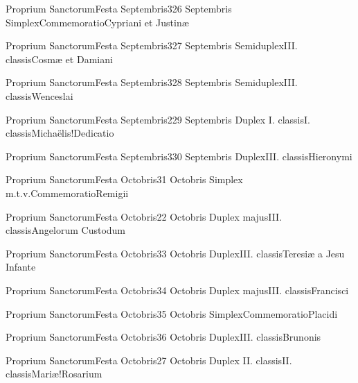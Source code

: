 \documentclass[psalterium-feriale.tex]{subfiles}
\begin{document}
	{Proprium Sanctorum}{Festa Septembris}{3}{26 Septembris}
	{Simplex}{Commemoratio}{Cypriani et Justinæ}
	{}
	{}
\PMEXaRubric

	{Proprium Sanctorum}{Festa Septembris}{3}{27 Septembris}
	{Semiduplex}{III. classis}{Cosmæ et Damiani}
	{}
	{}
\PMEXaRubric

	{Proprium Sanctorum}{Festa Septembris}{3}{28 Septembris}
	{Semiduplex}{III. classis}{Wenceslai}
	{}
	{}
\UMEXaRubric

	{Proprium Sanctorum}{Festa Septembris}{2}{29 Septembris}
	{Duplex I. classis}{I. classis}{Michaëlis!Dedicatio}
	{}
	{}
\psalmodiapropria

	{Proprium Sanctorum}{Festa Septembris}{3}{30 Septembris}
	{Duplex}{III. classis}{Hieronymi}
	{}
	{}
\COPOcRubric

	{Proprium Sanctorum}{Festa Octobris}{3}{1 Octobris}
	{Simplex m.t.v.}{Commemoratio}{Remigii}
	{}
	{}
\COPOaRubric

	{Proprium Sanctorum}{Festa Octobris}{2}{2 Octobris}
	{Duplex majus}{III. classis}{Angelorum Custodum}
	{}
	{}
\psalmodiapropria

	{Proprium Sanctorum}{Festa Octobris}{3}{3 Octobris}
	{Duplex}{III. classis}{Teresiæ a Jesu Infante}
	{}
	{}
\MUVNcRubric

	{Proprium Sanctorum}{Festa Octobris}{3}{4 Octobris}
	{Duplex majus}{III. classis}{Francisci} %
	{}
	{}
\COPOcRubric

	{Proprium Sanctorum}{Festa Octobris}{3}{5 Octobris}
	{Simplex}{Commemoratio}{Placidi}
	{}
	{}
\PMEXaRubric

	{Proprium Sanctorum}{Festa Octobris}{3}{6 Octobris}
	{Duplex}{III. classis}{Brunonis}
	{}
	{}
\COPOcRubric

	{Proprium Sanctorum}{Festa Octobris}{2}{7 Octobris}
	{Duplex II. classis}{II. classis}{Mariæ!Rosarium}
	{}
	{}
\psalmodiapropria
\end{document}
